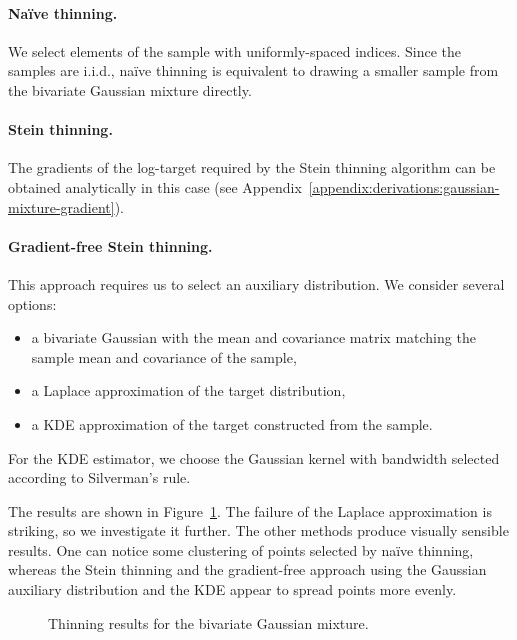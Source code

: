 \documentclass[11pt,a4paper]{report}
\begin{document}
\paragraph{Na\"ive thinning.} We select elements of the sample with uniformly-spaced indices. Since the samples are i.i.d., na\"ive thinning is equivalent to drawing a smaller sample from the bivariate Gaussian mixture directly.

\paragraph{Stein thinning.} The gradients of the log-target required by the Stein thinning algorithm can be obtained analytically in this case (see Appendix~\ref{appendix:derivations:gaussian-mixture-gradient}). 

\paragraph{Gradient-free Stein thinning.} This approach requires us to select an auxiliary distribution. We consider several options:
\begin{itemize}
\item a bivariate Gaussian with the mean and covariance matrix matching the sample mean and covariance of the sample,
\item a Laplace approximation of the target distribution,
\item a KDE approximation of the target constructed from the sample.
\end{itemize}

For the KDE estimator, we choose the Gaussian kernel with bandwidth selected according to Silverman's rule.

The results are shown in Figure~\ref{fig:gmm:thinned}. The failure of the Laplace approximation is striking, so we investigate it further. The other methods produce visually sensible results. One can notice some clustering of points selected by na\"ive thinning, whereas the Stein thinning and the gradient-free approach using the Gaussian auxiliary distribution and the KDE appear to spread points more evenly.

\begin{figure}[h!]
\centering
{}
\caption{Thinning results for the bivariate Gaussian mixture.
\label{fig:gmm:thinned}}
\end{figure}
\end{document}
